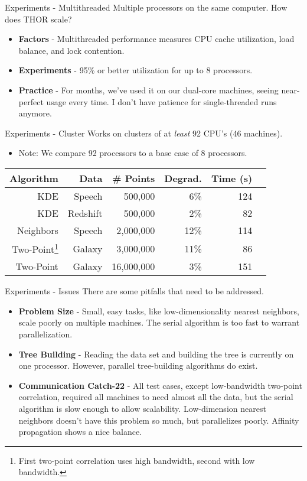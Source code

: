 \documentclass[pdf,colorBG,slideColor]{prosper}
\newcommand{\itemt}[1]{\item {\bf #1} -}
\begin{document}
\begin{slide}{Experiments - Multithreaded}
  Multiple processors on the same computer.
  How does THOR scale?
  \begin{itemize}
    \itemt{Factors}
    Multithreaded performance measures CPU cache utilization,
    load balance, and lock contention.
    \itemt{Experiments}
    95\% or better utilization for up to 8 processors.
    \itemt{Practice}
    For months, we've used it on our dual-core machines, seeing
    near-perfect usage every time.  I don't have patience for single-threaded
    runs anymore.
  \end{itemize}
\end{slide}

\begin{slide}{Experiments - Cluster}
  Works on clusters of at {\it least} 92 CPU's (46 machines).
  \begin{itemize}
    \item Note: We compare 92 processors to a base case of 8 processors.
  \end{itemize}
  \begin{tabular}{|r|r|r|r|r|r|}
    \hline
    {\bf Algorithm} & {\bf Data} & \# Points & Degrad. & Time (s)
    \\ \hline
    KDE & Speech & 500,000 & 6\% & 124
    \\ \hline
    KDE & Redshift & 500,000 & 2\% & 82
    \\ \hline
    Neighbors & Speech & 2,000,000 & 12\% & 114
    \\ \hline
    Two-Point\footnote{First two-point correlation uses high bandwidth, second with low bandwidth.} & Galaxy & 3,000,000 & 11\% & 86
    \\ \hline
    Two-Point & Galaxy & 16,000,000 & 3\% & 151
    \\ \hline
  \end{tabular}
\end{slide}

\begin{slide}{Experiments - Issues}
  There are some pitfalls that need to be addressed.
  \begin{itemize}
    \itemt{Problem Size}
    Small, easy tasks, like low-dimensionality nearest neighbors, scale poorly on multiple machines.
    The serial algorithm is too fast to warrant parallelization.
    \itemt{Tree Building}
    Reading the data set and building the tree is currently on one processor.
    However, parallel tree-building algorithms do exist.
    \itemt{Communication Catch-22}
    All test cases, except low-bandwidth two-point correlation, required
    all machines to need almost all the data, but the serial algorithm
    is slow enough to allow scalability.  Low-dimension nearest neighbors
    doesn't have this problem so much, but parallelizes poorly.
    Affinity propagation shows a nice balance.
  \end{itemize}
\end{slide}
\end{document}
